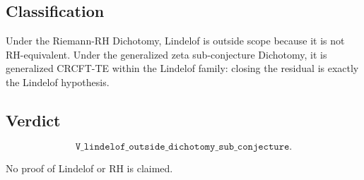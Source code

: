 \subsection*{Classification}

Under the Riemann-RH Dichotomy, Lindelof is outside scope because it is not RH-equivalent. Under the generalized zeta sub-conjecture Dichotomy, it is generalized CRCFT-TE within the Lindelof family: closing the residual is exactly the Lindelof hypothesis.

\subsection*{Verdict}

\[
\texttt{V\_lindelof\_outside\_dichotomy\_sub\_conjecture}.
\]

No proof of Lindelof or RH is claimed.
